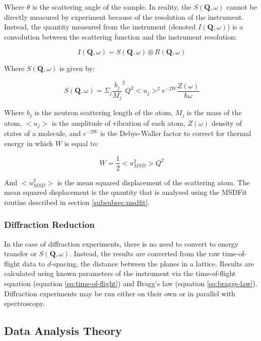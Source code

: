 \documentclass[paper=a4, fontsize=11pt]{scrartcl}	%
\numberwithin{equation}{section}															%
\numberwithin{figure}{section}																%
\numberwithin{table}{section}																%
\begin{document}
Where $\theta$ is the scattering angle of the sample. In reality, the $S(\mathbf{Q}, \omega)$ cannot be directly measured by experiment because of the resolution of the instrument. Instead, the quantity measured from the instrument (denoted $I(\mathbf{Q}, \omega)$) is a convolution between the scattering function and the instrument resolution:

\begin{equation}
\label{eq:instrument-result}
I(\mathbf{Q}, \omega) = S(\mathbf{Q}, \omega) \otimes R(\mathbf{Q}, \omega)
\end{equation}

Where $S(\mathbf{Q}, \omega)$ is given by:

\begin{equation}
S(\mathbf{Q}, \omega) = \Sigma_j \frac{b_j}{M_j}^2Q^2 < u_j >^2 e^{-2W}\frac{Z(\omega)}{\hbar\omega}
\end{equation}

Where $b_j$ is the neutron scattering length of the atom, $M_j$ is the mass of the atom, $< u_j >$ is the amplitude of vibration of each atom,  $Z(\omega)$ density of states of a molecule, and $e^{-2W}$ is the Debye-Waller factor \cite{smukhopadhyay2014} to correct for thermal energy in which $W$ is equal to:

\begin{equation}
W = \frac{1}{2} < u^2_{MSD} > Q^2
\end{equation}

And $< u^2_{MSD} >$ is the mean squared displacement of the scattering atom. The mean squared displacement is the quantity that is analysed using the MSDFit routine described in section \ref{subsubsec:msdfit}.

\subsubsection{Diffraction Reduction}
In the case of diffraction experiments, there is no need to convert to energy transfer or $S(\mathbf{Q}, \omega)$. Instead, the results are converted from the raw time-of-flight data to $d$-spacing, the distance between the planes in a lattice. Results are calculated using known parameters of the instrument via the time-of-flight equation (equation \ref{eq:time-of-flight}) and Bragg's law (equation \ref{eq:braggs-law}). Diffraction experiments may be run either on their own or in parallel with spectroscopy.

\subsection{Data Analysis Theory}
\end{document}
